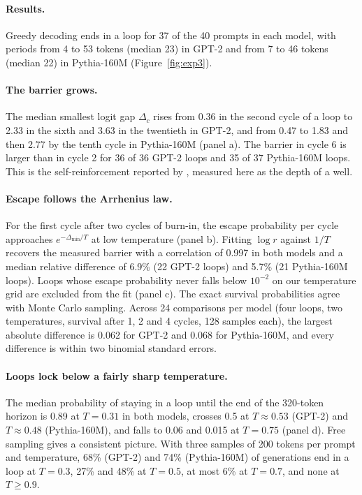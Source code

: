 \paragraph{Results.} Greedy decoding ends in a loop for 37 of the 40 prompts in each model, with periods from 4 to 53 tokens (median 23) in GPT-2 and from 7 to 46 tokens (median 22) in Pythia-160M (Figure~\ref{fig:exp3}).

\paragraph{The barrier grows.} The median smallest logit gap $\Delta_c$ rises from 0.36 in the second cycle of a loop to 2.33 in the sixth and 3.63 in the twentieth in GPT-2, and from 0.47 to 1.83 and then 2.77 by the tenth cycle in Pythia-160M (panel a). The barrier in cycle 6 is larger than in cycle 2 for 36 of 36 GPT-2 loops and 35 of 37 Pythia-160M loops. This is the self-reinforcement reported by \citet{xu2022learning}, measured here as the depth of a well.

\paragraph{Escape follows the Arrhenius law.} For the first cycle after two cycles of burn-in, the escape probability per cycle approaches $e^{-\Delta_{\min}/T}$ at low temperature (panel b). Fitting $\log r$ against $1/T$ recovers the measured barrier with a correlation of 0.997 in both models and a median relative difference of 6.9\% (22 GPT-2 loops) and 5.7\% (21 Pythia-160M loops). Loops whose escape probability never falls below $10^{-2}$ on our temperature grid are excluded from the fit (panel c). The exact survival probabilities agree with Monte Carlo sampling. Across 24 comparisons per model (four loops, two temperatures, survival after 1, 2 and 4 cycles, 128 samples each), the largest absolute difference is 0.062 for GPT-2 and 0.068 for Pythia-160M, and every difference is within two binomial standard errors.

\paragraph{Loops lock below a fairly sharp temperature.} The median probability of staying in a loop until the end of the 320-token horizon is 0.89 at $T=0.31$ in both models, crosses 0.5 at $T\approx0.53$ (GPT-2) and $T\approx0.48$ (Pythia-160M), and falls to 0.06 and 0.015 at $T=0.75$ (panel d). Free sampling gives a consistent picture. With three samples of 200 tokens per prompt and temperature, 68\% (GPT-2) and 74\% (Pythia-160M) of generations end in a loop at $T=0.3$, 27\% and 48\% at $T=0.5$, at most 6\% at $T=0.7$, and none at $T\ge0.9$.

